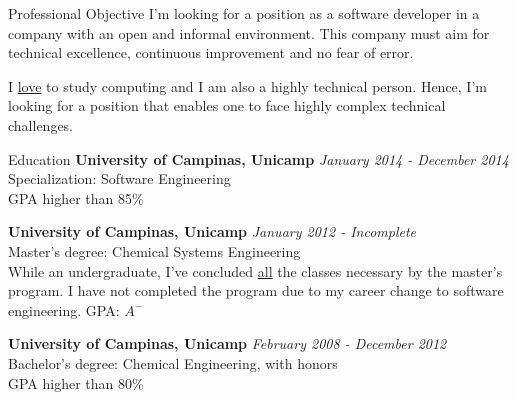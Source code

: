 \documentclass{resume} %
\begin{document}
\begin{rSection}{Professional Objective}
  I'm looking for a position as a software developer in a company with an
  open and informal environment. This company must aim for technical excellence,
  continuous improvement and no fear of error.

  I \underline{love} to study computing and I am also a highly technical person.
  Hence, I'm looking for a position that enables one to face highly complex
  technical challenges.
\end{rSection}

\begin{rSection}{Education}
  {\bf University of Campinas, Unicamp} \hfill {\em January 2014 - December 2014} \\
  Specialization: Software Engineering \\
  GPA higher than 85\%

  {\bf University of Campinas, Unicamp} \hfill {\em January 2012 - Incomplete} \\
  Master's degree: Chemical Systems Engineering \\
  While an undergraduate, I've concluded \underline{all} the classes necessary by
  the master's program. I have not completed the program due to my career change
  to software engineering.
  GPA: $A^-$

  {\bf University of Campinas, Unicamp} \hfill {\em February 2008 - December 2012} \\
  Bachelor's degree: Chemical Engineering, with honors \\
  GPA higher than 80\%
\end{rSection}
\end{document}
